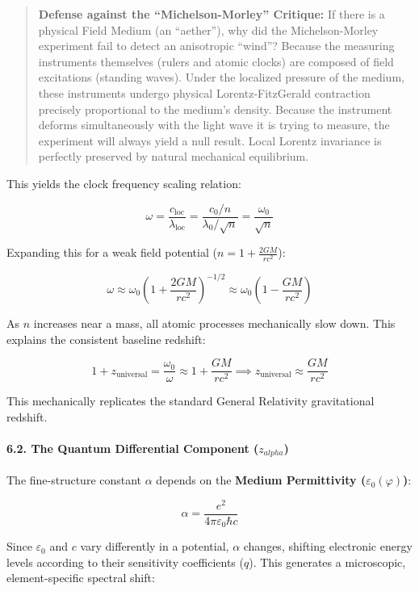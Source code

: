 \documentclass[twocolumn]{article}
\begin{document}
\begin{quote}
\textbf{Defense against the ``Michelson-Morley'' Critique:} If there is
a physical Field Medium (an ``aether''), why did the Michelson-Morley
experiment fail to detect an anisotropic ``wind''? Because the measuring
instruments themselves (rulers and atomic clocks) are composed of field
excitations (standing waves). Under the localized pressure of the
medium, these instruments undergo physical Lorentz-FitzGerald
contraction precisely proportional to the medium's density. Because the
instrument deforms simultaneously with the light wave it is trying to
measure, the experiment will always yield a null result. Local Lorentz
invariance is perfectly preserved by natural mechanical equilibrium.
\end{quote}

This yields the clock frequency scaling relation:

\[ \omega = \frac{c_{\text{loc}}}{\lambda_{\text{loc}}} = \frac{c_0 / n}{\lambda_0 / \sqrt{n}} = \frac{\omega_0}{\sqrt{n}} \]

Expanding this for a weak field potential
(\(n = 1 + \frac{2GM}{rc^2}\)):

\[ \omega \approx \omega_0 \left( 1 + \frac{2GM}{rc^2} \right)^{-1/2} \approx \omega_0 \left( 1 - \frac{GM}{rc^2} \right) \]

As \(n\) increases near a mass, all atomic processes mechanically slow
down. This explains the consistent baseline redshift:

\[ 1 + z_{\text{universal}} = \frac{\omega_0}{\omega} \approx 1 + \frac{GM}{rc^2} \implies z_{\text{universal}} \approx \frac{GM}{rc^2} \]

This mechanically replicates the standard General Relativity
gravitational redshift.

\paragraph{\texorpdfstring{6.2. The Quantum Differential Component
(\(z_{alpha}\))}{6.2. The Quantum Differential Component (z\_\{alpha\})}}\label{the-quantum-differential-component-z_alpha}

The fine-structure constant \(\alpha\) depends on the \textbf{Medium
Permittivity (\(\varepsilon_0(\varphi)\))}:

\[\alpha = \frac{e^2}{4\pi \varepsilon_0 \hbar c}\]

Since \(\varepsilon_0\) and \(c\) vary differently in a potential,
\(\alpha\) changes, shifting electronic energy levels according to their
sensitivity coefficients (\(q\)). This generates a microscopic,
element-specific spectral shift:
\end{document}
